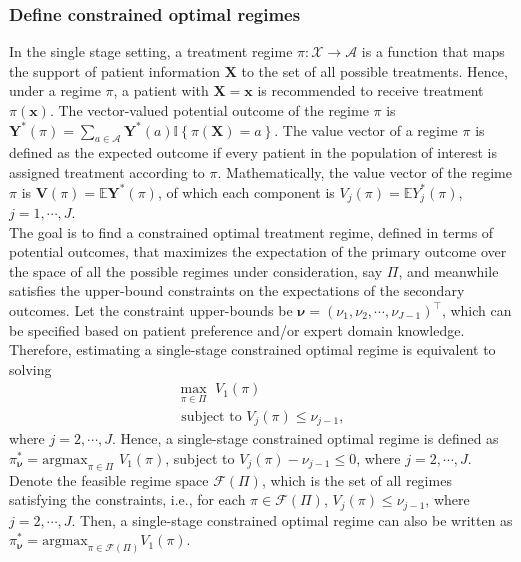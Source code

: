 \documentclass{article}
\newcommand{\itl}{\intercal}
\newcommand{\bs}{ \boldsymbol}
\newcommand{\mb}{\mathbb}
\newcommand{\ml}{\mathcal}
\newcommand{\lt}{\left}
\newcommand{\rt}{\right}
\begin{document}
\subsubsection{Define constrained optimal regimes}
In the single stage setting, a treatment regime $\pi : \bs{\ml{X}} \rightarrow \ml{A}$ is a function that maps the support of patient information $\bs{X}$ to the set of all possible treatments. Hence, under a regime $\pi$, a patient with $\bs{X} = \bs{x}$ is recommended to receive treatment $\pi(\bs{x})$. The vector-valued potential outcome of the regime $\pi$ is $\bs{Y}^{*}(\pi) =  \sum_{a \in \ml{A}}\bs{Y}^{*}\lt(a\rt)\mb{I}\lt\{ \pi(\bs{X}) = a \rt\}$. The value vector of a regime $\pi$ is defined as the expected outcome if every patient in the population of interest is assigned treatment according to $\pi$. Mathematically, the value vector of the regime $\pi$ is $\bs{V}(\pi) = \mb{E} {\bs{Y}^{*}\lt(\pi\rt)}$, of which each component is $V_j(\pi) = \mb{E}Y_j^{*}(\pi)$, $j = 1, \cdots, J$. \\
 
The goal is to find a constrained optimal treatment regime, defined in terms of potential outcomes, that maximizes the expectation of the primary outcome over the space of all the possible regimes under consideration, say $\Pi$, and meanwhile satisfies the upper-bound constraints on the expectations of the secondary outcomes. Let the constraint upper-bounds be $\bs{\nu} = (\nu_1, \nu_2, \cdots, \nu_{J-1})^\itl$, which can be specified based on patient preference and/or expert domain knowledge. Therefore, estimating a single-stage  constrained optimal regime is equivalent to solving
\begin{equation}
\begin{gathered}
\max_{\pi \in \Pi} \,\, V_1\lt(\pi\rt) \\
\text{ subject to } V_j\lt(\pi\rt) \le \nu_{j-1},
\end{gathered}
\end{equation}  where $j = 2, \cdots, J$.  Hence, a single-stage constrained optimal regime is defined as $\pi^*_{\bs{\nu}} = \text{argmax}_{\pi \in \Pi} \,\, V_1(\pi)$, subject to $V_j(\pi) - \nu_{j-1} \le 0$, where $j = 2, \cdots, J$. Denote the feasible regime space $\ml{F}(\Pi)$, which is the set of all regimes satisfying the constraints, i.e., for each $\pi \in \ml{F}(\Pi)$, $V_j(\pi) \le \nu_{j-1}$, where $j = 2, \cdots, J$. Then, a single-stage constrained optimal regime can also be written as $\pi^*_{\bs{\nu}} = \text{argmax}_{\pi \in \ml{F}(\Pi)}V_1\lt(\pi\rt)$.\\
 
\end{document}
